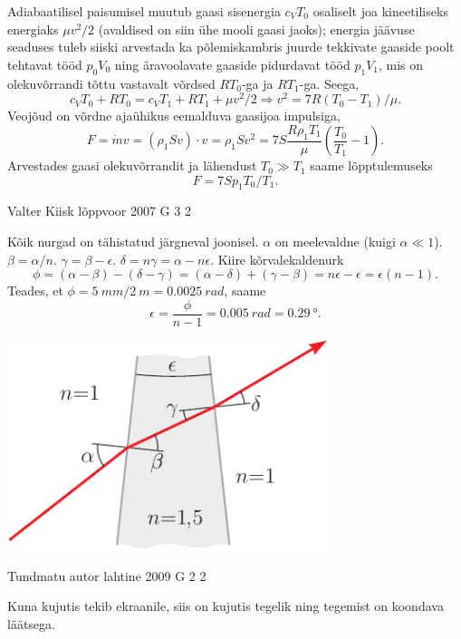 \documentclass[11pt, twoside]{article}
\begin{document}
{{\ifSolution
Adiabaatilisel paisumisel muutub gaasi sisenergia $c_VT_0$ osaliselt joa kineetiliseks energiaks $\mu v^2/2$ (avaldised on siin ühe mooli gaasi jaoks); 
energia jäävuse seaduses tuleb siiski arvestada ka põlemiskambris juurde tekkivate gaaside poolt tehtavat tööd $p_0V_0$ ning
äravoolavate gaaside pidurdavat tööd $p_1V_1$, mis on olekuvõrrandi tõttu
vastavalt võrdsed $RT_0$-ga ja $RT_1$-ga. Seega, 
$$c_VT_0+RT_0=c_VT_1+RT_1+\mu v^2/2 \Rightarrow v^2=7R(T_0-T_1)/\mu.$$
Veojõud on võrdne ajaühikus eemalduva gaasijoa impulsiga,
$$F=\dot m v =(\rho_1 Sv)\cdot v=\rho_1 S v^2 = 7S\frac{R\rho_1T_1}{\mu}\left(\frac{T_0}{T_1}-1\right).$$
Arvestades gaasi olekuvõrrandit ja lähendust $T_0\gg T_1$ saame lõpptulemuseks
$$F=7Sp_1T_0/T_1.$$
\fi
}

{Valter Kiisk} %
{lõppvoor} %
{2007} %
{G 3} %
{2} %
{

\ifSolution
Kõik nurgad on tähistatud järgneval joonisel. $\alpha$ on meelevaldne (kuigi $\alpha \ll 1$). $\beta = \alpha /n$. $\gamma = \beta - \epsilon$. $\delta = n\gamma = \alpha - n\epsilon$. Kiire kõrvalekaldenurk
\[
\phi=(\alpha-\beta)-(\delta-\gamma)=(\alpha-\delta)+(\gamma-\beta)=n \epsilon-\epsilon=\epsilon(n-1).
\]
Teades, et $\phi = \SI{5}{mm}/\SI{2}{m} = \SI{0.0025}{rad}$, saame
\[
\epsilon=\frac{\phi}{n-1}=\SI{0,005}{rad}=\SI{0,29}{\degree}.
\]

\begin{center}
	\includegraphics[width=0.7\textwidth]{2007-v3g-03-yl}
\end{center}
\fi
}

{Tundmatu autor} %
{lahtine} %
{2009} %
{G 2} %
{2} %
{

\ifSolution
Kuna kujutis tekib ekraanile, siis on kujutis tegelik ning tegemist on koondava läätsega.

}}
\end{document}

